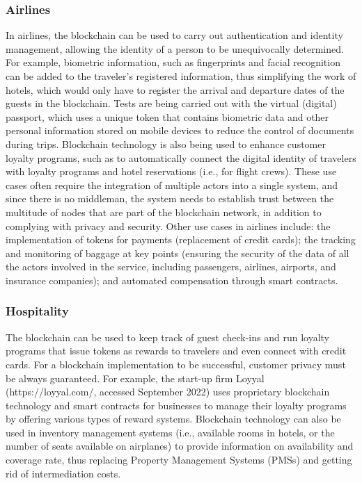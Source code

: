 \documentclass[
  letterpaper,
  DIV=11,
  numbers=noendperiod]{scrreprt}
\begin{document}
\hypertarget{airlines}{%
\subsubsection{Airlines}\label{airlines}}

In airlines, the blockchain can be used to carry out authentication and
identity management, allowing the identity of a person to be
unequivocally determined. For example, biometric information, such as
fingerprints and facial recognition can be added to the traveler's
registered information, thus simplifying the work of hotels, which would
only have to register the arrival and departure dates of the guests in
the blockchain. Tests are being carried out with the virtual (digital)
passport, which uses a unique token that contains biometric data and
other personal information stored on mobile devices to reduce the
control of documents during trips. Blockchain technology is also being
used to enhance customer loyalty programs, such as to automatically
connect the digital identity of travelers with loyalty programs and
hotel reservations (i.e., for flight crews). These use cases often
require the integration of multiple actors into a single system, and
since there is no middleman, the system needs to establish trust between
the multitude of nodes that are part of the blockchain network, in
addition to complying with privacy and security. Other use cases in
airlines include: the implementation of tokens for payments (replacement
of credit cards); the tracking and monitoring of baggage at key points
(ensuring the security of the data of all the actors involved in the
service, including passengers, airlines, airports, and insurance
companies); and automated compensation through smart contracts.

\hypertarget{hospitality}{%
\subsubsection{Hospitality}\label{hospitality}}

The blockchain can be used to keep track of guest check-ins and run
loyalty programs that issue tokens as rewards to travelers and even
connect with credit cards. For a blockchain implementation to be
successful, customer privacy must be always guaranteed. For example, the
start-up firm Loyyal (https://loyyal.com/, accessed September 2022) uses
proprietary blockchain technology and smart contracts for businesses to
manage their loyalty programs by offering various types of reward
systems. Blockchain technology can also be used in inventory management
systems (i.e., available rooms in hotels, or the number of seats
available on airplanes) to provide information on availability and
coverage rate, thus replacing Property Management Systems (PMSs) and
getting rid of intermediation costs.
\end{document}

